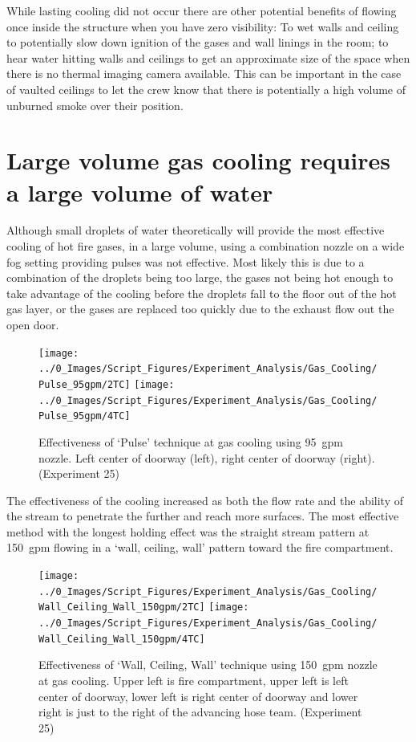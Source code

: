 \documentclass[12pt,oneside]{book}
\begin{document}
While lasting cooling did not occur there are other potential benefits of flowing once inside the structure when you have zero visibility: To wet walls and ceiling to potentially slow down ignition of the gases and wall linings in the room; to hear water hitting walls and ceilings to get an approximate size of the space when there is no thermal imaging camera available. This can be important in the case of vaulted ceilings to let the crew know that there is potentially a high volume of unburned smoke over their position. 

\section{Large volume gas cooling requires a large volume of water} \label{tc:large_volume_gas_cooling}
Although small droplets of water theoretically will provide the most effective cooling of hot fire gases, in a large volume, using a combination nozzle on a wide fog setting providing pulses was not effective. Most likely this is due to a combination of the droplets being too large, the gases not being hot enough to take advantage of the cooling before the droplets fall to the floor out of the hot gas layer, or the gases are replaced too quickly due to the exhaust flow out the open door.

\begin{figure}[H]
\centering
\texttt{[image: ../0\_Images/Script\_Figures/Experiment\_Analysis/Gas\_Cooling/Pulse\_95gpm/2TC]}
\texttt{[image: ../0\_Images/Script\_Figures/Experiment\_Analysis/Gas\_Cooling/Pulse\_95gpm/4TC]}
\caption[Gas Cooling Example - Pulse 95~gpm Setting]{Effectiveness of `Pulse' technique at gas cooling using 95~gpm nozzle. Left center of doorway (left), right center of doorway (right). (Experiment 25)}
\label{fig:gas_pulse_95_TC}
\end{figure}

The effectiveness of the cooling increased as both the flow rate and the ability of the stream to penetrate the further and reach more surfaces. The most effective method with the longest holding effect was the straight stream pattern at 150~gpm flowing in a `wall, ceiling, wall' pattern toward the fire compartment. 

 \begin{figure}[H]
\centering
\texttt{[image: ../0\_Images/Script\_Figures/Experiment\_Analysis/Gas\_Cooling/Wall\_Ceiling\_Wall\_150gpm/2TC]}
\texttt{[image: ../0\_Images/Script\_Figures/Experiment\_Analysis/Gas\_Cooling/Wall\_Ceiling\_Wall\_150gpm/4TC]}
\caption[Gas Cooling - Straight Stream 150~gpm]{Effectiveness of `Wall, Ceiling, Wall' technique using 150~gpm nozzle at gas cooling. Upper left is fire compartment, upper left is left center of doorway, lower left is right center of doorway and lower right is just to the right of the advancing hose team. (Experiment 25)}
\label{fig:gas_wall_ceiling_wall_150_TC}
\end{figure}
\end{document}
